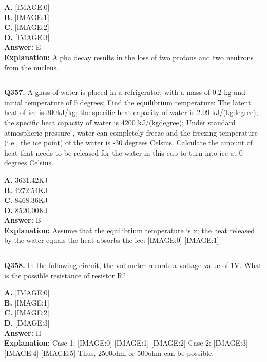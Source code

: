 \documentclass[12pt]{article}
\begin{document}
\textbf{A.} [IMAGE:0] \\
\textbf{B.} [IMAGE:1] \\
\textbf{C.} [IMAGE:2] \\
\textbf{D.} [IMAGE:3] \\

\textbf{Answer:} E \\
\textbf{Explanation:} Alpha decay results in the loss of two protons and two neutrons from the nucleus.

\hrule
\vspace{1em}


\noindent
\textbf{Q357.} A glass of water is placed in a refrigerator; with a mass of 0.2 kg and initial temperature of 5 degrees; Find the equilibrium temperature: The latent heat of ice is 300kJ/kg; the specific heat capacity of water is 2.09 kJ/(kg\cdot degree); the specific heat capacity of water is 4200 kJ/(kg\cdot degree); Under standard atmospheric pressure , water can completely freeze and the freezing temperature (i.e., the ice point) of the water is -30 degrees Celsius.
Calculate the amount of heat that needs to be released for the water in this cup to turn into ice at 0 degrees Celsius.



\textbf{A.} 3631.42KJ \\
\textbf{B.} 4272.54KJ \\
\textbf{C.} 8468.36KJ \\
\textbf{D.} 8520.00KJ \\

\textbf{Answer:} B \\
\textbf{Explanation:} Assume that the equilibrium temperature is x; the heat released by the water equals the heat absorbs the ice:
[IMAGE:0]
[IMAGE:1]

\hrule
\vspace{1em}


\noindent
\textbf{Q358.} In the following circuit, the voltmeter records a voltage value of 1V.
What is the possible resistance of resistor R?



\textbf{A.} [IMAGE:0] \\
\textbf{B.} [IMAGE:1] \\
\textbf{C.} [IMAGE:2] \\
\textbf{D.} [IMAGE:3] \\

\textbf{Answer:} H \\
\textbf{Explanation:} Case 1:
[IMAGE:0]
[IMAGE:1]
[IMAGE:2]
Case 2:
[IMAGE:3]
[IMAGE:4]
[IMAGE:5]
Thus, 2500ohm or 500ohm can be possible.
\end{document}

